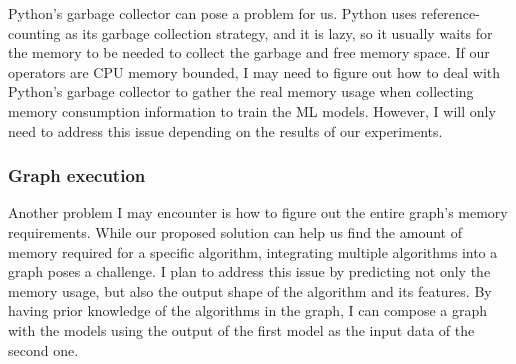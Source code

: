 Python's garbage collector can pose a problem for us.
Python uses reference-counting as its garbage collection strategy, and it is lazy, so it usually waits for the memory to be needed to collect the garbage and free memory space.
If our operators are \ac{CPU} memory bounded, I may need to figure out how to deal with Python's garbage collector to gather the real memory usage when collecting memory consumption information to train the ML models.
However, I will only need to address this issue depending on the results of our experiments.

\subsubsection{Graph execution}

Another problem I may encounter is how to figure out the entire graph's memory requirements.
While our proposed solution can help us find the amount of memory required for a specific algorithm, integrating multiple algorithms into a graph poses a challenge.
I plan to address this issue by predicting not only the memory usage, but also the output shape of the algorithm and its features.
By having prior knowledge of the algorithms in the graph, I can compose a graph with the models using the output of the first model as the input data of the second one.
